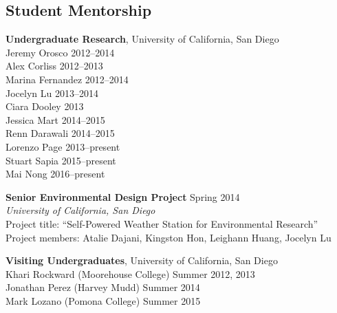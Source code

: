 \documentclass[]{res}
\begin{document}
\begin{resume}
\section{Student Mentorship}
\vspace{0.1in}

\textbf{Undergraduate Research}, University of California, San Diego \\
Jeremy Orosco \hfill 2012--2014 \\
Alex Corliss \hfill 2012--2013 \\
Marina Fernandez \hfill 2012--2014 \\
Jocelyn Lu \hfill 2013--2014 \\
Ciara Dooley \hfill 2013 \\
Jessica Mart \hfill 2014--2015 \\
Renn Darawali \hfill 2014--2015 \\
Lorenzo Page \hfill 2013--present \\
Stuart Sapia \hfill 2015--present \\
Mai Nong \hfill 2016--present

\textbf{Senior Environmental Design Project} \hfill Spring 2014 \\
\textit{University of California, San Diego} \\
Project title: ``Self-Powered Weather Station for Environmental Research'' \\
Project members: Atalie Dajani, Kingston Hon, Leighann Huang, Jocelyn Lu

%

\textbf{Visiting Undergraduates}, University of California, San Diego \\
Khari Rockward (Moorehouse College) \hfill Summer 2012, 2013 \\
Jonathan Perez (Harvey Mudd) \hfill Summer 2014 \\
Mark Lozano (Pomona College) \hfill Summer 2015


\end{resume}
\end{document}
